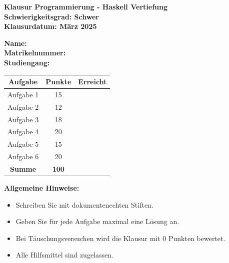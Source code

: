 \documentclass[12pt,a4paper]{article}
\begin{document}
\begin{center}
    \textbf{\Large Klausur Programmierung - Haskell Vertiefung}\\
    \vspace{0.5cm}
    \textbf{Schwierigkeitsgrad: Schwer}\\
    \vspace{0.5cm}
    \textbf{Klausurdatum: März 2025}
\end{center}

\vspace{1cm}

\noindent
\textbf{Name:} \underline{\hspace{8cm}}\\
\textbf{Matrikelnummer:} \underline{\hspace{5cm}}\\
\textbf{Studiengang:} \underline{\hspace{5cm}}

\vspace{1cm}

\begin{center}
\begin{tabular}{|c|c|c|}
\hline
\textbf{Aufgabe} & \textbf{Punkte} & \textbf{Erreicht} \\ \hline
Aufgabe 1 & 15 & \\ \hline
Aufgabe 2 & 12 & \\ \hline
Aufgabe 3 & 18 & \\ \hline
Aufgabe 4 & 20 & \\ \hline
Aufgabe 5 & 15 & \\ \hline
Aufgabe 6 & 20 & \\ \hline
\textbf{Summe} & \textbf{100} & \\ \hline
\end{tabular}
\end{center}

\vspace{1cm}

\noindent
\textbf{Allgemeine Hinweise:}
\begin{itemize}
    \item Schreiben Sie mit dokumentenechten Stiften.
    \item Geben Sie für jede Aufgabe maximal eine Lösung an.
    \item Bei Täuschungsversuchen wird die Klausur mit 0 Punkten bewertet.
    \item Alle Hilfsmittel sind zugelassen.
\end{itemize}
\end{document}
